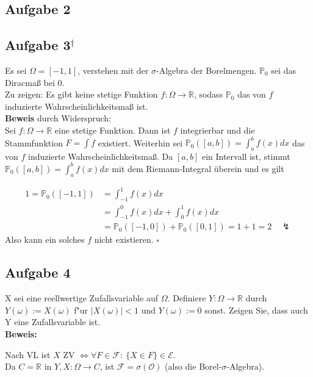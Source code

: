 \documentclass[11pt,a4paper,ngerman]{article}
\newcommand{\set}[1]{ \{ #1 \}}
\newcommand{\Prob}{\mathbb{P}}
\newcommand{\R}{\mathbb{R}}
\newcommand{\bigO}{\mathcal{O}}
\newcommand{\rarr}{\rightarrow}
\newcommand{\abs}[1]{ |#1|}
\newcommand{\Epsilon}{\mathcal{E}}
\newcommand{\alex}{$^\dagger$}
\begin{document}
\subsection*{Aufgabe 2}


\subsection*{Aufgabe 3\alex}
Es sei $\Omega = [-1,1]$, verstehen mit der $\sigma$-Algebra der Borelmengen.
$\Prob_0$ sei das Diracmaß bei 0.\\
Zu zeigen: Es gibt keine stetige Funktion $f: \Omega \to  \mathbb{R}$,
sodass $\Prob_0$ das von $f$ induzierte Wahrscheinlichkeitsmaß ist. \\

\textbf{Beweis} durch Widerspruch: \\
Sei $f: \Omega \to \mathbb{R}$ eine stetige Funktion. Dann ist $f$ integrierbar und
die Stammfunktion $F = \int f$ existiert. Weiterhin sei $\Prob_0([a,b]) = \int_a^b f(x) dx$
das von $f$ induzierte Wahrscheinlichkeitsmaß. Da $[a,b]$ ein Intervall ist,
stimmt $\Prob_0([a,b]) = \int_a^b f(x) dx$ mit dem Riemann-Integral überein und es gilt

\begin{equation*}\begin{split}
1 = \Prob_0([-1,1]) &= \int_{-1}^1 f(x) dx \\
  &=  \int_{-1}^0 f(x) dx +  \int_{0}^1 f(x) dx \\
  &= \Prob_0([-1,0]) +  \Prob_0([0,1]) = 1 + 1 = 2 \quad \lightning
\end{split}\end{equation*}
Also kann ein solches $f$ nicht existieren.
\mbox{} \hfill $\square$

\subsection*{Aufgabe 4}

X sei eine reellwertige Zufallsvariable auf $\Omega$. Definiere $Y : \Omega \rarr \R$
durch $Y(\omega) := X(\omega)$ f"ur $\abs{X(\omega)}< 1$  und $Y(\omega) := 0$
sonst. Zeigen Sie, dass auch Y eine Zufallsvariable ist. \\

{\bf Beweis:}

Nach VL ist $X$ ZV $\Leftrightarrow \forall F\in \mathcal{F}:\ \set{X \in F} \in \Epsilon$. \\

Da $C = \R$ in $Y,X: \Omega \rarr C$, ist $\mathcal{F} = \sigma(\bigO)$ (also
die Borel-$\sigma$-Algebra). \\
\end{document}

